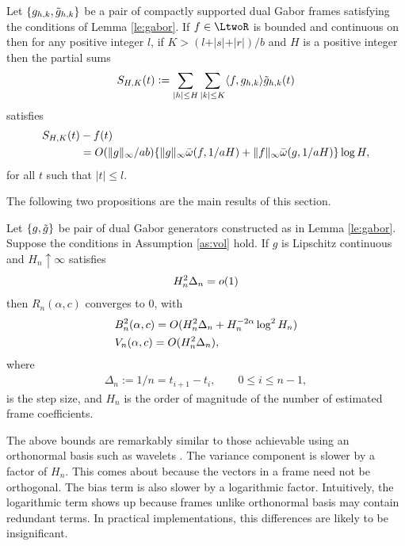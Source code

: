 \begin{lem} \label{th:fourone}
  Let $\{g_{h,k}, \tilde{g}_{h,k}\}$ be a pair of compactly supported dual Gabor frames satisfying the conditions of Lemma \eqref{le:gabor}. If $f \in \LtwoR$ is bounded and continuous on \real then for any positive integer $l$, if $K > (l + \vert s \vert + \vert r \vert)/ b$ and $H$ is a positive integer then  the partial sums 
  \begin{align}
    S_{H,K} (t) := \sum_{\vert h \vert \le H} \sum_{\vert k \vert \le K} \langle{f},{g_{h,k}}\rangle \tilde{g}_{h,k}(t)  \notag
    \label{}
  \end{align}
  satisfies
  \begin{align}
    S_{H,K} (t) & - f(t) \notag \\  &= O({\Vert g \Vert_{\infty}}/{ab}) \{ \Vert g \Vert_{\infty}{\bar{\omega}}({f},1/aH) + \Vert f \Vert_{\infty} {\bar{\omega}}({g},1/aH)\} \log H\notag, 
    \label{}
  \end{align}
for all $t$ such that $\vert t\vert \le l$.
\end{lem}
The following two propositions are the main results of this section.
\begin{prop} \label{pr:consistency}
  Let $\{g, \tilde{g}\}$ be pair of dual Gabor generators constructed as in Lemma \eqref{le:gabor}.   Suppose the conditions in  Assumption \ref{as:vol}  hold. If $g$ is Lipschitz continuous and $H_n \uparrow \infty$ satisfies  
  \begin{align}
    H_n^2 \Delta_n  = o(1) \notag
    \label{}
  \end{align}
   then $R_n(\alpha,c)$ converges to 0, with 
  \begin{align}
    & B_n^2(\alpha,c)  = O(H_n^2\Delta_n  + H_n^{-2\alpha} \log^2 H_n)\notag \\
    & V_n(\alpha,c)  = O(H_n^2 \Delta_n),
    \label{}
  \end{align}
  where  
  \begin{align}
    \Delta_n := 1/n = t_{i + 1}  - t_i,   \qquad 0 \le i \le n - 1,   
\end{align} is the step size, and $H_n$ is the order of magnitude of the number of estimated frame coefficients. 
\end{prop}
\begin{remark}\mbox{}
The above bounds are remarkably similar to those achievable using an orthonormal basis such as wavelets \citep{GenonCatalot1992}. The variance component is slower by a factor of $H_n$. This comes about because the vectors in a frame need not be orthogonal. The bias term is also  slower by a logarithmic factor. Intuitively, the logarithmic term shows up because frames unlike orthonormal basis may contain  redundant terms. In practical implementations, this differences are likely to be insignificant. 
\end{remark}
